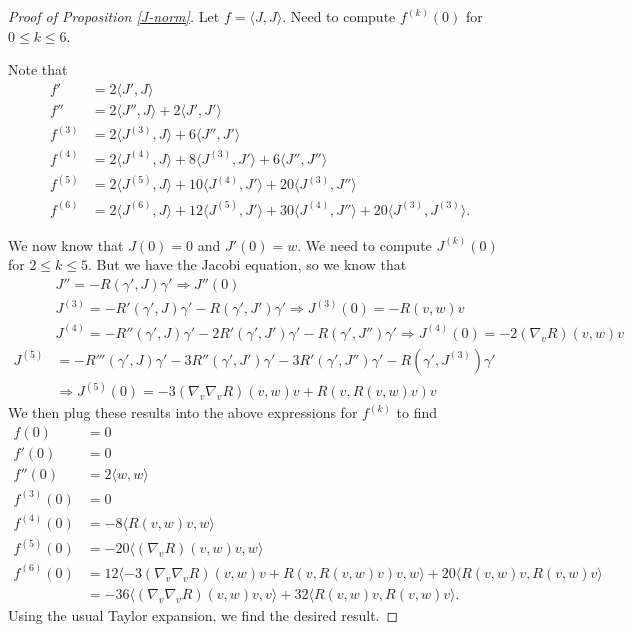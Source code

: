 \documentclass{amsart}
\numberwithin{equation}{section}
\theoremstyle{definition}
\theoremstyle{theorem}
\begin{document}
\begin{proof}[Proof of Proposition \ref{J-norm}]
Let $f = \langle J, J \rangle$. Need to compute $f^{(k)}(0)$ for $0 \le k \le 6$. 

Note that 
\begin{align*}
f' &= 2 \langle J', J \rangle \\
f'' &= 2\langle J'', J \rangle + 2 \langle J', J' \rangle \\
f^{(3)} &= 2 \langle J^{(3)}, J  \rangle + 6\langle J'', J' \rangle \\
f^{(4)} &= 2 \langle J^{(4)}, J \rangle + 8 \langle J^{(3)}, J' \rangle + 6 \langle J'', J'' \rangle \\
f^{(5)} &= 2 \langle J^{(5)}, J \rangle + 10 \langle J^{(4)}, J' \rangle + 20 \langle J^{(3)}, J'' \rangle \\
f^{(6)} &=2 \langle J^{(6)}, J \rangle + 12 \langle J^{(5)}, J' \rangle + 30 \langle J^{(4)}, J'' \rangle + 20 \langle J^{(3)}, J^{(3)} \rangle. 
\end{align*}

We now know that $J(0) = 0$ and $J'(0) = w$. We need to compute $J^{(k)}(0)$ for $2 \le k \le 5$. But we have the Jacobi equation, so we know that 
\begin{align*}
& J''= - R(\gamma', J) \gamma' \Rightarrow J''(0) \\
& J^{(3)} = - R'(\gamma', J)\gamma' - R(\gamma', J')\gamma' \Rightarrow J^{(3)}(0) = -R(v,w)v \\
& J^{(4)} = -R''(\gamma', J)\gamma' - 2R'(\gamma', J')\gamma' - R(\gamma', J'')\gamma' 
\Rightarrow J^{(4)}(0) = -2(\nabla_v R)(v,w)v \\
J^{(5)} &= -R'''(\gamma', J)\gamma' - 3 R''(\gamma', J')\gamma' - 3 R'(\gamma', J'')\gamma' - R(\gamma', J^(3))\gamma' \\
&\Rightarrow J^{(5)}(0)= -3(\nabla_v\nabla_vR)(v,w)v + R(v,R(v,w)v)v
\end{align*}
We then plug these results into the above expressions for $f^{(k)}$ to find 
\begin{align*}
f(0) &= 0 \\
f'(0) &= 0 \\
f''(0) &= 2 \langle w, w \rangle \\
f^{(3)}(0) &= 0 \\
f^{(4)}(0) &= -8 \langle R(v,w)v, w \rangle \\
f^{(5)}(0) &= -20 \langle (\nabla_vR)(v,w)v, w \rangle \\
f^{(6)}(0) &= 12 \langle -3(\nabla_v\nabla_vR)(v,w)v + R(v, R(v,w)v)v, w \rangle + 20 \langle R(v,w)v, R(v,w)v \rangle \\
&= -36 \langle (\nabla_v\nabla_vR)(v,w)v, v \rangle + 32 \langle R(v,w)v, R(v,w)v \rangle.
\end{align*}
Using the usual Taylor expansion, we find the desired result. 
\end{proof}
\end{document}

